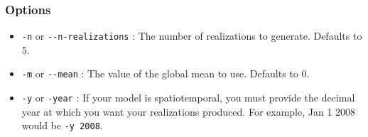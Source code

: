 \subsubsection{Options%
}
%
\begin{itemize}

\item \texttt{-n} or \texttt{-{}-n-realizations} : The number of realizations to generate. Defaults to 5.

\item \texttt{-m} or \texttt{-{}-mean} : The value of the global mean to use. Defaults to 0.

\item \texttt{-y} or \texttt{-year} : If your model is spatiotemporal, you must provide the decimal year at
which you want your realizations produced. For example, Jan 1 2008 would be \texttt{-y 2008}.

\end{itemize}
